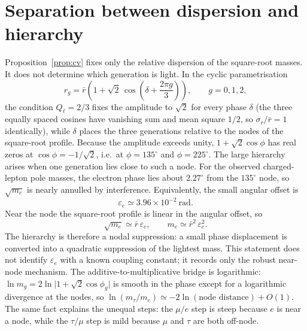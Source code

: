 \documentclass[11pt]{article}
\theoremstyle{definition}
\theoremstyle{remark}
\begin{document}
  \section{Separation between dispersion and hierarchy}
    \label{sec:separation}

    Proposition~\ref{prop:cv} fixes only the relative dispersion of the square-root masses.
    It does not determine which generation is light.
    In the cyclic parametrisation
    \begin{equation}
      \label{eq:cyclic}
      r_g = \bar r \left( 1 + \sqrt2 \, \cos\!\left( \delta + \frac{2\pi g}{3} \right) \right),
      \qquad g = 0, 1, 2,
    \end{equation}
    the condition $Q_\ell = 2/3$ fixes the amplitude to $\sqrt2$ for every phase $\delta$ (the three equally spaced
    cosines have vanishing sum and mean square $1/2$, so $\sigma_r/\bar r = 1$ identically), while $\delta$ places
    the three generations relative to the nodes of the square-root profile.
    Because the amplitude exceeds unity, $1 + \sqrt2 \cos\phi$ has real zeros at $\cos\phi = -1/\sqrt2$, i.e.\ at
    $\phi = 135^\circ$ and $\phi = 225^\circ$.
    The large hierarchy arises when one generation lies close to such a node.
    For the observed charged-lepton pole masses, the electron phase lies about $2.27^\circ$ from the $135^\circ$
    node, so $\sqrt{m_e}$ is nearly annulled by interference.
    Equivalently, the small angular offset is
    \begin{equation}
      \label{eq:eps-e}
      \varepsilon_e \simeq 3.96 \times 10^{-2}\ \mathrm{rad}.
    \end{equation}
    Near the node the square-root profile is linear in the angular offset, so
    \begin{equation}
      \label{eq:nodal}
      \sqrt{m_e} \simeq \bar r\,\varepsilon_e, \qquad m_e \simeq \bar r^2\,\varepsilon_e^2 .
    \end{equation}
    The hierarchy is therefore a nodal suppression: a small phase displacement is converted into a quadratic
    suppression of the lightest mass.
    This statement does not identify $\varepsilon_e$ with a known coupling constant; it records only the robust
    near-node mechanism.
    The additive-to-multiplicative bridge is logarithmic: $\ln m_g = 2 \ln\lvert 1 + \sqrt2 \cos\phi_g \rvert$ is
    smooth in the phase except for a logarithmic divergence at the nodes, so
    $\ln(m_\tau/m_e) \simeq -2 \ln(\text{node distance}) + O(1)$.
    The same fact explains the unequal steps: the $\mu/e$ step is steep because $e$ is near a node, while the
    $\tau/\mu$ step is mild because $\mu$ and $\tau$ are both off-node.
\end{document}
